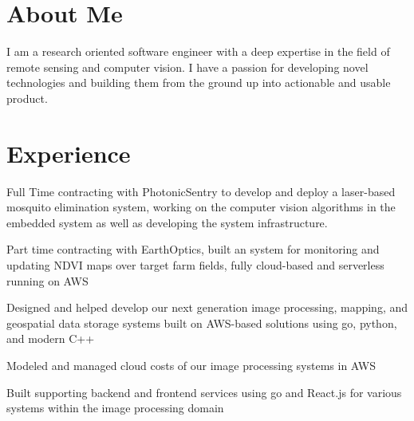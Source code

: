 \documentclass[]{nilosek-resume}
\begin{document}
\begin{minipage}[t]{0.7\textwidth} 


\section{About Me}
I am a research oriented software engineer with a deep expertise in the field of remote sensing and computer vision. I have a passion for developing novel technologies and building them from the ground up into actionable and usable product.


\section{Experience}
\vspace{\topsep} %
\begin{tightemize}
	\item Full Time contracting with PhotonicSentry to develop and deploy a laser-based mosquito elimination system, working on the computer vision algorithms in the embedded system as well as developing the system infrastructure.
	\item Part time contracting with EarthOptics, built an system for monitoring and updating NDVI maps over target farm fields, fully cloud-based and serverless running on AWS
\end{tightemize}
\sectionsep

\vspace{\topsep} %
\begin{tightemize}
	\item Designed and helped develop our next generation image processing, mapping, and geospatial data storage systems built on AWS-based solutions using go, python, and modern C++
	\item Modeled and managed cloud costs of our image processing systems in AWS
	\item Built supporting backend and frontend services using go and React.js for various systems within the image processing domain
\end{tightemize}
\sectionsep


\end{minipage}
\end{document}

